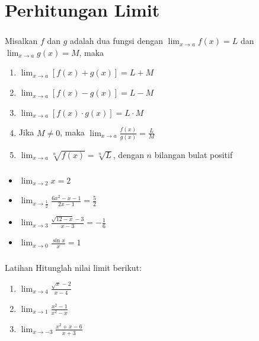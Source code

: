 \documentclass{../../kalkulus-ppt}
\begin{document}
\section{Perhitungan Limit}
\begin{frame}
    \frametitle{\insertsection}
    \begin{teorema}
        Misalkan $f$ dan $g$ adalah dua fungsi dengan $\displaystyle\lim_{x\to a} f(x)=L$ dan $\displaystyle\lim_{x\to a} g(x)=M$, maka
        \begin{enumerate}
            \item $\displaystyle\lim_{x\to a} [f(x)+g(x)]=L+M$
            \item $\displaystyle\lim_{x\to a} [f(x)-g(x)]=L-M$
            \item $\displaystyle\lim_{x\to a} [f(x)\cdot g(x)]=L\cdot M$
            \item Jika $M\ne 0$, maka $\displaystyle\lim_{x\to a} \frac{f(x)}{g(x)}=\frac{L}{M}$
            \item $\displaystyle\lim_{x\to a} \sqrt[n]{f(x)}=\sqrt[n]{L}$, dengan $n$ bilangan bulat positif
        \end{enumerate}
    \end{teorema}
\end{frame}
\begin{frame}
    \frametitle{\insertsection}
    \begin{contoh}
        \begin{itemize}
            \item $\displaystyle\lim_{x\to 2} x=2$
            \item $\displaystyle\lim_{x\to \frac{1}{2}} \frac{6x^2-x-1}{2x-1}=\frac{5}{2}$
            \item $\displaystyle\lim_{x\to 3} \frac{\sqrt{12-x}-3}{x-3}=-\frac{1}{6}$
            \item $\displaystyle\lim_{x\to 0} \frac{\sin x}{x}=1$
        \end{itemize}
    \end{contoh}
\end{frame}
\begin{frame}
    \frametitle{\insertsection}
    \begin{exampleblock}{Latihan}
        Hitunglah nilai limit berikut:
        \begin{enumerate}
            \item $\displaystyle\lim_{x\to 4} \frac{\sqrt{x}-2}{x-4}$
            \item $\displaystyle\lim_{x\to 1} \frac{x^2-1}{x^2-x}$
            \item $\displaystyle\lim_{x\to -3} \frac{x^2+x-6}{x+3}$
        \end{enumerate}
    \end{exampleblock}
\end{frame}
\end{document}
